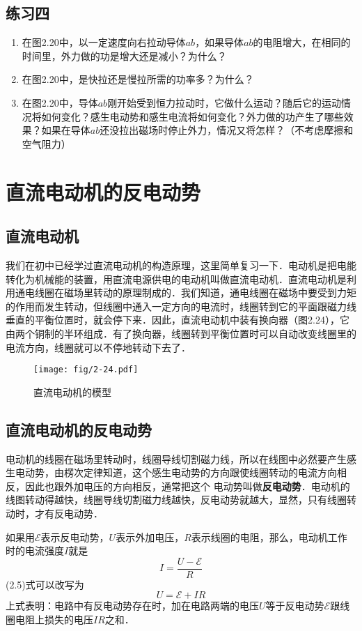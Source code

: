 \subsection*{练习四}
\begin{enumerate}
    \item 在图2.20中，以一定速度向右拉动导体$ab$，如果导体$ab$的电阻增大，在相同的时间里，外力做的功是增大还是减小？为什么？
    \item 在图2.20中，是快拉还是慢拉所需的功率多？为什么？
    \item 在图2.20中，导体$ab$刚开始受到恒力拉动时，它做什么运动？随后它的运动情况将如何变化？感生电动势和感生电流将如何变化？外力做的功产生了哪些效果？如果在导体$ab$还没拉出磁场时停止外力，情况又将怎样？（不考虑摩擦和空气阻力）
\end{enumerate}

\section{直流电动机的反电动势}
\subsection{直流电动机}

我们在初中已经学过直流电动机的构造原理，这里简单复习一下．电动机是把电能转化为机械能的装置，用直流电源供电的电动机叫做直流电动机．直流电动机是利用通电线圈在磁场里转动的原理制成的．我们知道，通电线圈在磁场中要受到力矩的作用而发生转动，但线圈中通入一定方向的电流时，线圈转到它的平面跟磁力线垂直的平衡位置时，就会停下来．因此，直流电动机中装有换向器（图2.24），它由两个铜制的半环组成．有了换向器，线圈转到平衡位置时可以自动改变线圈里的电流方向，线圈就可以不停地转动下去了．
\begin{figure}[htp]\centering
\texttt{[image: fig/2-24.pdf]}
\caption{直流电动机的模型}
\end{figure}

\subsection{直流电动机的反电动势}

电动机的线圈在磁场里转动时，线圈导线切割磁力线，所以在线图中必然要产生感生电动势，由楞次定律知道，这个感生电动势的方向跟使线圈转动的电流方向相反，因此也跟外加电压的方向相反，通常把这个
电动势叫做\textbf{反电动势}．电动机的线图转动得越快，线圈导线切割磁力线越快，反电动势就越大，显然，只有线圈转动时，才有反电动势．

如果用$\mathcal{E}$表示反电动势，$U$表示外加电压，$R$表示线圈的电阻，那么，电动机工作时的电流强度$I$就是
\begin{equation}
    I=\frac{U-\mathcal{E}}{R}
\end{equation}
(2.5)式可以改写为
\begin{equation}
    U=\mathcal{E}+IR
\end{equation}
上式表明：电路中有反电动势存在时，加在电路两端的电压$U$等于反电动势$\mathcal{E}$跟线圈电阻上损失的电压$IR$之和．

